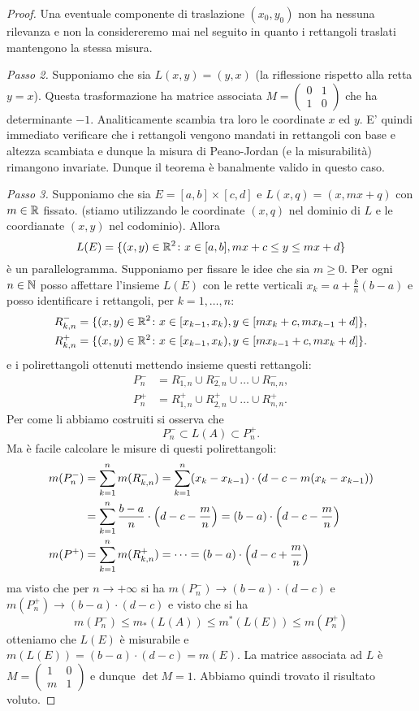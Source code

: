 \begin{proof}
Una eventuale componente di traslazione $(x_0,y_0)$ non ha nessuna
rilevanza e non la considereremo mai nel seguito in quanto i rettangoli traslati mantengono la stessa misura.

\emph{Passo 2.}
Supponiamo che sia $L(x,y) = (y,x)$ (la riflessione rispetto alla retta $y=x$). Questa trasformazione ha matrice associata $M=\begin{pmatrix}0&1\\1&0\end{pmatrix}$ che ha determinante
$-1$. Analiticamente scambia tra loro le coordinate $x$ ed $y$.
E' quindi immediato verificare che i rettangoli vengono mandati
in rettangoli con base e altezza scambiata e dunque la misura di
Peano-Jordan (e la misurabilità) rimangono invariate.
Dunque il teorema è banalmente valido in questo caso.

\emph{Passo 3.}
Supponiamo che sia $E=[a,b]\times[c,d]$ e $L(x,q)=(x,mx+q)$
con $m\in \mathbb R$ fissato.
(stiamo utilizzando le coordinate $(x,q)$ nel dominio di $L$
e le coordianate $(x,y)$ nel codominio).
Allora
\[
  L(E) = \{(x,y)\in \mathbb R^2\colon x\in[a,b], mx+c \le y \le mx+d\}
\]
è un parallelogramma. Supponiamo per fissare le idee che sia $m\ge 0$.
Per ogni $n\in \mathbb N$ posso affettare l'insieme
$L(E)$ con le rette verticali $x_k = a+\frac{k}{n}(b-a)$ e posso
identificare i rettangoli, per $k=1,\dots, n$:
\begin{align*}
   R_{k,n}^-
   &= \{(x,y)\in \mathbb R^2 \colon x\in [x_{k-1},x_k), y\in[m x_k+c,m x_{k-1}+d]\},
   \\
   R_{k,n}^+
   &= \{(x,y)\in \mathbb R^2 \colon x\in [x_{k-1},x_k), y\in[m x_{k-1}+c,m x_k+d]\}.
\end{align*}
e i polirettangoli ottenuti mettendo insieme questi rettangoli:
\begin{align*}
  P^-_n &= R_{1,n}^- \cup R_{2,n}^- \cup \dots \cup R_{n,n}^-, \\
  P^+_n & = R_{1,n}^+ \cup R_{2,n}^+ \cup \dots \cup R_{n,n}^+.
\end{align*}
Per come li abbiamo costruiti si osserva che
\[
  P^-_n \subset L(A) \subset P^+_n.
\]
Ma è facile calcolare le misure di questi polirettangoli:
\begin{align*}
  m(P^-_n) &= \sum_{k=1}^n m(R_{k,n}^-)
          = \sum_{k=1}^n(x_k-x_{k-1})\cdot (d-c-m(x_k-x_{k-1}))\\
         &= \sum_{k=1}^n \frac {b-a} n \cdot {\left( d-c-\frac{m}{n} \right)}
          = (b-a)\cdot {\left( d-c-\frac{m}{n} \right)} \\
  m(P^+) &= \sum_{k=1}^n m(R_{k,n}^+) = \dots = (b-a)\cdot {\left( d-c+\frac{m}{n} \right)}
\end{align*}
ma visto che per $n\to +\infty$ si ha $m(P^-_n)\to (b-a)\cdot(d-c)$
e $m(P^+_n) \to (b-a)\cdot(d-c)$ e visto che si ha
\[
  m(P^-_n)\le m_*(L(A))\le m^*(L(E)) \le m(P^+_n)
\]
otteniamo che $L(E)$ è misurabile e $m(L(E)) = (b-a)\cdot(d-c) = m(E)$.
La matrice associata ad $L$ è $M=\begin{pmatrix}1 & 0 \\ m & 1 \end{pmatrix}$
e dunque $\det M = 1$. Abbiamo quindi trovato il risultato voluto.


\end{proof}

